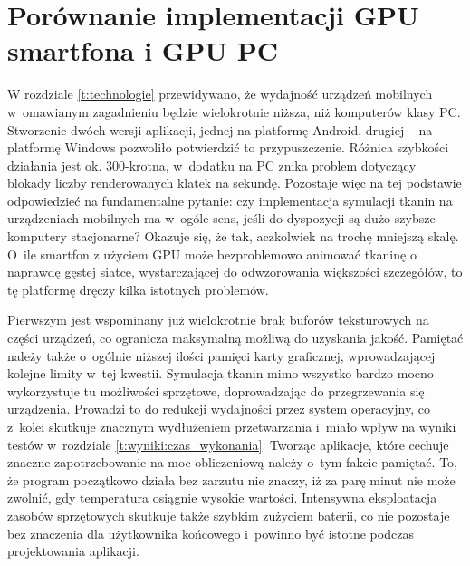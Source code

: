 	\section{Porównanie implementacji GPU smartfona i GPU PC}
	\label{t:wnioski:andro_vs_pc}
	
	
	W rozdziale \ref{t:technologie} przewidywano, że wydajność urządzeń mobilnych w~omawianym zagadnieniu będzie wielokrotnie niższa, niż komputerów klasy PC. Stworzenie dwóch wersji aplikacji, jednej na platformę Android, drugiej -- na platformę Windows pozwoliło potwierdzić to przypuszczenie. Różnica szybkości działania jest ok. 300-krotna, w~dodatku na PC znika problem dotyczący blokady liczby renderowanych klatek na sekundę. Pozostaje więc na tej podstawie odpowiedzieć na fundamentalne pytanie: czy implementacja symulacji tkanin na urządzeniach mobilnych ma w~ogóle sens, jeśli do dyspozycji są dużo szybsze komputery stacjonarne? Okazuje się, że tak, aczkolwiek na trochę mniejszą skalę. O~ile smartfon z użyciem GPU może bezproblemowo animować tkaninę o naprawdę gęstej siatce, wystarczającej do odwzorowania większości szczegółów, to tę platformę dręczy kilka istotnych problemów. 
	
	Pierwszym jest wspominany już wielokrotnie brak buforów teksturowych na części urządzeń, co ogranicza maksymalną możliwą do uzyskania jakość. Pamiętać należy także o~ogólnie niższej ilości pamięci karty graficznej, wprowadzającej kolejne limity w~tej kwestii. Symulacja tkanin mimo wszystko bardzo mocno wykorzystuje tu możliwości sprzętowe, doprowadzając do przegrzewania się urządzenia. Prowadzi to do redukcji wydajności przez system operacyjny, co z~kolei skutkuje znacznym wydłużeniem przetwarzania i~miało wpływ na wyniki testów w~rozdziale \ref{t:wyniki:czas_wykonania}. Tworząc aplikacje, które cechuje znaczne zapotrzebowanie na moc obliczeniową należy o~tym fakcie pamiętać. To, że program początkowo działa bez zarzutu nie znaczy, iż za parę minut nie może zwolnić, gdy temperatura osiągnie wysokie wartości. Intensywna eksploatacja zasobów sprzętowych skutkuje także szybkim zużyciem baterii, co nie pozostaje bez znaczenia dla użytkownika końcowego i~powinno być istotne podczas projektowania aplikacji.
	

